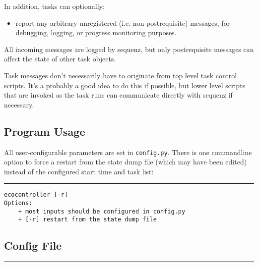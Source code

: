\documentclass[11pt,a4paper]{article}
\begin{document}
In addition, tasks can optionally:

\begin{itemize}
\item report any arbitrary unregistered (i.e. non-postrequisite)
messages, for debugging, logging, or progress monitoring purposes.
\end{itemize}

All incoming messages are logged by sequenz, but only postrequisite
messages can affect the state of other task objects.

Task messages don't necessarily have to originate from top level task
control scripts. It's a probably a good idea to do this if possible, but
lower level scripts that are invoked as the task runs can communicate
directly with sequenz if necessary.

\subsection{Program Usage}

All user-configurable parameters are set in \verb#config.py#. There is
one commandline option to force a restart from the state dump file
(which may have been edited) instead of the configured start time and
task list:

\lstset{language=sh}

{\small

\noindent
\rule{5cm}{.2mm}
\begin{lstlisting}
ecocontroller [-r]
Options:
    + most inputs should be configured in config.py
    + [-r] restart from the state dump file
\end{lstlisting}
}

\lstset{language=Python}

\subsection{Config File}

{\small
\noindent
\rule{5cm}{.2mm}

}
\end{document}
